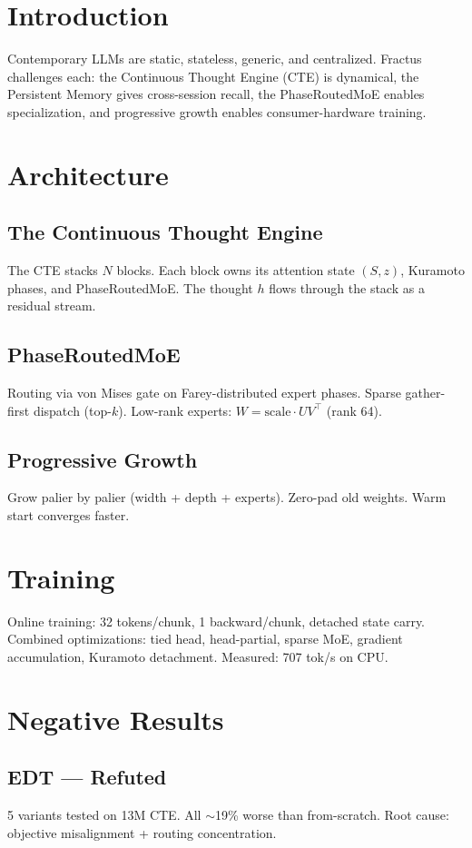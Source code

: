 \section{Introduction}
Contemporary LLMs are static, stateless, generic, and centralized. Fractus challenges each: the Continuous Thought Engine (CTE) is dynamical, the Persistent Memory gives cross-session recall, the PhaseRoutedMoE enables specialization, and progressive growth enables consumer-hardware training.

\section{Architecture}

\subsection{The Continuous Thought Engine}
The CTE stacks $N$ blocks. Each block owns its attention state $(S, z)$, Kuramoto phases, and PhaseRoutedMoE. The thought $h$ flows through the stack as a residual stream.

\subsection{PhaseRoutedMoE}
Routing via von Mises gate on Farey-distributed expert phases. Sparse gather-first dispatch (top-$k$). Low-rank experts: $W = \text{scale} \cdot U V^\top$ (rank 64).

\subsection{Progressive Growth}
Grow palier by palier (width + depth + experts). Zero-pad old weights. Warm start converges faster.

\section{Training}
Online training: 32 tokens/chunk, 1 backward/chunk, detached state carry. Combined optimizations: tied head, head-partial, sparse MoE, gradient accumulation, Kuramoto detachment. Measured: 707 tok/s on CPU.

\section{Negative Results}
\subsection{EDT --- Refuted}
5 variants tested on 13M CTE. All $\sim$19\% worse than from-scratch. Root cause: objective misalignment + routing concentration.
